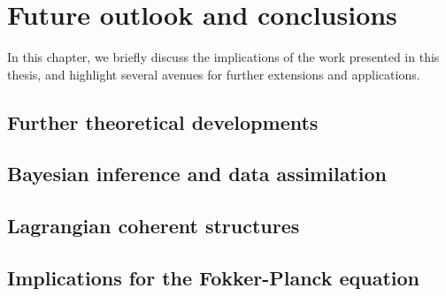\chapter{Future outlook and conclusions}
In this chapter, we briefly discuss the implications of the work presented in this thesis, and highlight several avenues for further extensions and applications.


\section{Further theoretical developments}


\section{Bayesian inference and data assimilation}


\section{Lagrangian coherent structures}


\section{Implications for the Fokker-Planck equation}
